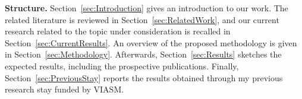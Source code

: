 \documentclass[10pt,notitlepage]{article}
\makeatletter
\newcommand*{\ie}{i.e.,\@\xspace}
\makeatother
\begin{document}
\textbf{Structure.} Section~\ref{sec:Introduction} gives an introduction to our work. The related literature is reviewed in Section~\ref{sec:RelatedWork}, and our current research related to the topic under consideration is recalled in Section~\ref{sec:CurrentResults}. An overview of the proposed methodology is given in Section~\ref{sec:Methodology}. Afterwards, Section~\ref{sec:Results} sketches the expected results, including the prospective publications. Finally, Section~\ref{sec:PreviousStay} reports the results obtained through my previous research stay funded by VIASM.




\end{document}
